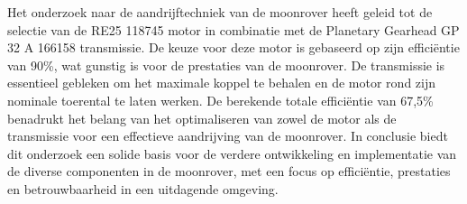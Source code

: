 Het onderzoek naar de aandrijftechniek van de moonrover heeft geleid tot de selectie van de RE25 118745 motor in combinatie met de Planetary Gearhead GP 32 A 166158 transmissie. De keuze voor deze motor is gebaseerd op zijn efficiëntie van 90\%, wat gunstig is voor de prestaties van de moonrover. De transmissie is essentieel gebleken om het maximale koppel te behalen en de motor rond zijn nominale toerental te laten werken. De berekende totale efficiëntie van 67,5\% benadrukt het belang van het optimaliseren van zowel de motor als de transmissie voor een effectieve aandrijving van de moonrover. In conclusie biedt dit onderzoek een solide basis voor de verdere ontwikkeling en implementatie van de diverse componenten in de moonrover, met een focus op efficiëntie, prestaties en betrouwbaarheid in een uitdagende omgeving.
